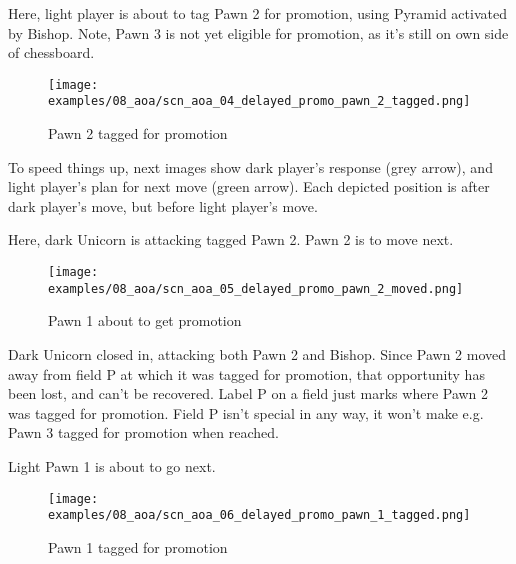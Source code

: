 Here, light player is about to tag Pawn 2 for promotion, using Pyramid
activated by Bishop. Note, Pawn 3 is not yet eligible for promotion, as it's
still on own side of chessboard.

\clearpage %

\noindent
\begin{figure}[h]
\texttt{[image: examples/08\_aoa/scn\_aoa\_04\_delayed\_promo\_pawn\_2\_tagged.png]}
\caption{Pawn 2 tagged for promotion}
\label{fig:scn_aoa_04_delayed_promo_pawn_2_tagged}
\end{figure}

To speed things up, next images show dark player's response (grey arrow),
and light player's plan for next move (green arrow). Each depicted position
is after dark player's move, but before light player's move.

Here, dark Unicorn is attacking tagged Pawn 2. Pawn 2 is to move next.

\clearpage %

\noindent
\begin{figure}[h]
\texttt{[image: examples/08\_aoa/scn\_aoa\_05\_delayed\_promo\_pawn\_2\_moved.png]}
\caption{Pawn 1 about to get promotion}
\label{fig:scn_aoa_05_delayed_promo_pawn_2_moved}
\end{figure}

Dark Unicorn closed in, attacking both Pawn 2 and Bishop. Since Pawn 2 moved
away from field P at which it was tagged for promotion, that opportunity has
been lost, and can't be recovered. Label P on a field just marks where Pawn 2
was tagged for promotion. Field P isn't special in any way, it won't make e.g.
Pawn 3 tagged for promotion when reached.

Light Pawn 1 is about to go next.

\clearpage %

\noindent
\begin{figure}[h]
\texttt{[image: examples/08\_aoa/scn\_aoa\_06\_delayed\_promo\_pawn\_1\_tagged.png]}
\caption{Pawn 1 tagged for promotion}
\label{fig:scn_aoa_06_delayed_promo_pawn_1_tagged}
\end{figure}

